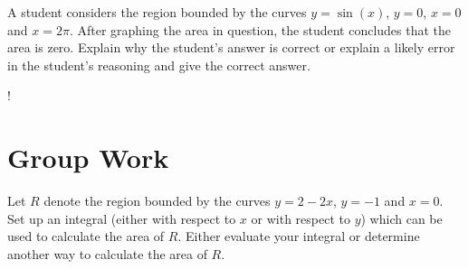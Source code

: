 \documentclass[handout]{ximera}
\begin{document}





\begin{freeResponse} 
\end{freeResponse}


\begin{problem}
A student considers the region bounded by the curves $y=\sin (x)$, $y = 0$, $x=0$ and $x=2\pi$. After graphing the area in question, the student concludes that the area is zero. Explain why the student's answer is correct or explain a likely error in the student's reasoning and give the correct answer.
\begin{center}
\resizebox {4cm} {!} { 
          }
\end{center}

\end{problem}

\begin{freeResponse}

\end{freeResponse}



\section{Group Work}

\begin{problem}
Let $R$ denote the region bounded by the curves $y=2-2x$, $y=-1$ and $x=0$. Set up an integral (either with respect to $x$ or with respect to $y$) which can be used to calculate the area of $R$. Either evaluate your integral or determine another way to calculate the area of $R$. 
\end{problem}
\end{document}
